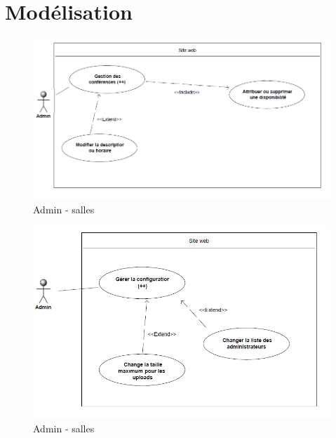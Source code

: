 \chapter{Modélisation}

    \begin{figure}[h]
        \begin{center}
            \includegraphics[scale=0.50]{images/uml/adminConference.png} 
        \end{center}

        \caption{Admin - salles}
        \label{Admin - salles}
    \end{figure}

    \begin{figure}[h]
        \begin{center}
            \includegraphics[scale=0.50]{images/uml/adminConfiguration.png} 
        \end{center}

        \caption{Admin - salles}
        \label{Admin - salles}
    \end{figure}

